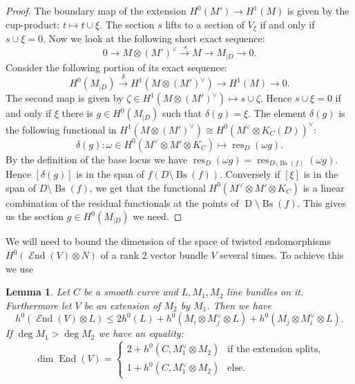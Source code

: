 \documentclass[12pt]{extarticle}
\newtheorem{lemma}[theorem]{Lemma}
\theoremstyle{definition}
\numberwithin{theorem}{section}
\newcommand{\op}{\operatorname}
\DeclareMathOperator{\End}{\mathcal{E}nd}
\begin{document}
\begin{proof}
The boundary map of the extension $H^0(M') \to H^1(M)$ is given by the cup-product: $t \mapsto t \cup \xi$. The section $s$ lifts to a section of $V_\xi$ if and only if $s \cup \xi = 0$. Now we look at the following short exact sequence:
\begin{equation*}
0 \to M\otimes (M')^\vee \xrightarrow{\cdot s} M \to M_{|D} \to 0.
\end{equation*} 
Consider the following portion of its exact sequence:
\begin{equation*}
H^0(M_{|D}) \xrightarrow{\delta} H^1(M\otimes (M')^\vee) \to H^1(M) \to 0.
\end{equation*}
The second map is given by $\zeta \in H^1(M\otimes (M')^\vee) \mapsto s \cup \zeta$. Hence $s \cup \xi = 0$ if and only if $\xi$ there is $ g \in H^0(M_{|D})$ such that $\delta(g) = \xi$. The element $\delta(g)$ is the following functional in $H^1(M\otimes (M')^\vee) \cong H^0(M^\vee\otimes K_C(D))^\vee$:
\begin{equation*}
\delta(g) : \omega \in  H^0(M^\vee\otimes M'\otimes K_C) \mapsto \op{res}_D(\omega g). 
\end{equation*}
By the definition of the base locus we have $\op{res}_D (\omega g) = \op{res}_{D\setminus \op{Bs}(f)} (\omega g)$. Hence $[\delta(g)]$ is in the span of $f(D\setminus \op{Bs}(f))$. Conversely if $[\xi]$ is in the span of $D\setminus \op{Bs}(f)$, we get that the functional $H^0(M^\vee \otimes M' \otimes K_C)$ is a linear combination of the residual functionals at the points of $\op{D}\setminus \op{Bs}(f)$. This gives us the section $g \in H^0(M_{|D})$ we need.
\end{proof}
We will need to bound the dimension of the space of twisted endomorphisms ${H^0(\End(V) \otimes N)}$ of a rank $2$ vector bundle $V$ several times. To achieve this we use 
\begin{lemma}\label{lemma.twisted_bound}
Let $C$ be a smooth curve and $L,M_1,M_2$ line bundles on it. Furthermore let $V$ be an extension of $M_2$ by $M_1$. Then we have 
\begin{equation*}
h^0(\End(V) \otimes L) \leq 2h^0(L) + h^0(M_i \otimes M_j^\vee \otimes L) + h^0(M_j \otimes M_i^\vee \otimes L).
\end{equation*}
If $\deg M_1 > \deg M_2$ we have an equality:
\begin{equation}\label{eq:dim_endos}
\dim \op{End}(V) = \begin{cases}
2 + h^0(C,M_1^\vee\otimes M_2) & \text{if the extension splits,}\\
1 + h^0(C,M_1^\vee\otimes M_2)&\text{else.}
\end{cases}
\end{equation}
\end{lemma}
\end{document}
